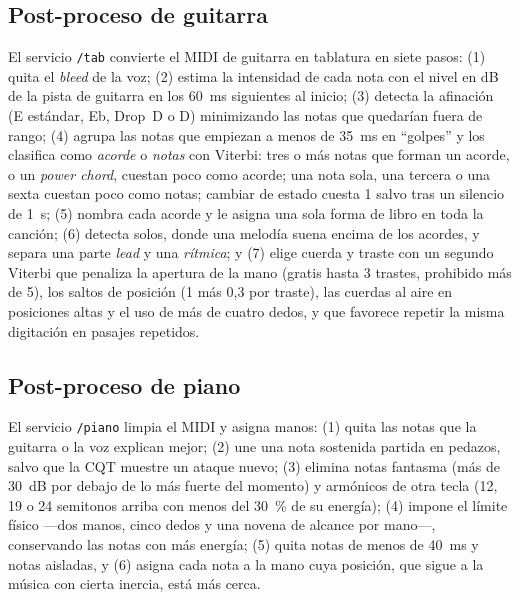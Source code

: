 \documentclass[11pt,a4paper]{article}
\begin{document}
\subsection{Post-proceso de guitarra}
El servicio \texttt{/tab} convierte el MIDI de guitarra en tablatura en siete pasos: (1) quita el
\emph{bleed} de la voz; (2) estima la intensidad de cada nota con el nivel en dB de la pista de guitarra
en los 60~ms siguientes al inicio; (3) detecta la afinación (E estándar, Eb, Drop~D o D) minimizando las
notas que quedarían fuera de rango; (4) agrupa las notas que empiezan a menos de 35~ms en ``golpes'' y
los clasifica como \emph{acorde} o \emph{notas} con Viterbi: tres o más notas que forman un acorde, o un
\emph{power chord}, cuestan poco como acorde; una nota sola, una tercera o una sexta cuestan poco como
notas; cambiar de estado cuesta 1 salvo tras un silencio de 1~s; (5) nombra cada acorde y le asigna una
sola forma de libro en toda la canción; (6) detecta solos, donde una melodía suena encima de los
acordes, y separa una parte \emph{lead} y una \emph{rítmica}; y (7) elige cuerda y traste con un segundo
Viterbi que penaliza la apertura de la mano (gratis hasta 3 trastes, prohibido más de 5), los saltos de
posición (1 más 0{,}3 por traste), las cuerdas al aire en posiciones altas y el uso de más de cuatro
dedos, y que favorece repetir la misma digitación en pasajes repetidos.

\subsection{Post-proceso de piano}
El servicio \texttt{/piano} limpia el MIDI y asigna manos: (1) quita las notas que la guitarra o la voz
explican mejor; (2) une una nota sostenida partida en pedazos, salvo que la CQT muestre un ataque nuevo;
(3) elimina notas fantasma (más de 30~dB por debajo de lo más fuerte del momento) y armónicos de otra
tecla (12, 19 o 24 semitonos arriba con menos del 30~\% de su energía); (4) impone el límite físico ---dos
manos, cinco dedos y una novena de alcance por mano---, conservando las notas con más energía; (5) quita
notas de menos de 40~ms y notas aisladas, y (6) asigna cada nota a la mano cuya posición, que sigue a la
música con cierta inercia, está más cerca.
\end{document}
